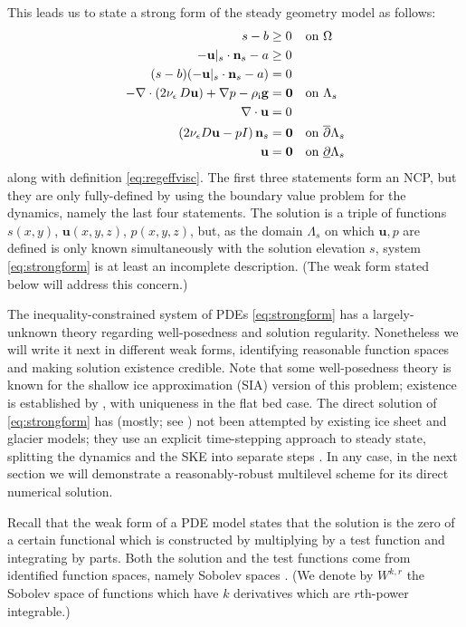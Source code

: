 \documentclass[letterpaper,final,12pt,reqno]{amsart}
\theoremstyle{claim}
\newcommand{\eps}{\epsilon}
\newcommand{\bn}{\mathbf{n}}
\newcommand{\bu}{\mathbf{u}}
\newcommand{\bzero}{\bm{0}}
\newcommand{\rhoi}{\rho_{\text{i}}}
\numberwithin{equation}{section}
\numberwithin{figure}{section}
\numberwithin{table}{section}
\numberwithin{theorem}{section}
\begin{document}
This leads us to state a strong form of the steady geometry model as follows:
\begin{align}
s - b &\ge 0 && \text{on $\Omega$} \label{eq:strongform} \\
- \bu|_s \cdot \bn_s - a &\ge 0 \notag \\
(s - b) (- \bu|_s \cdot \bn_s - a) &= 0 \notag \\
- \nabla \cdot \left(2 \nu_\eps\, D\bu\right) + \nabla p - \rhoi \mathbf{g} &= \bzero && \text{on $\Lambda_s$} \notag \\
\nabla \cdot \bu &= 0 \notag \\
\left(2 \nu_\eps D\bu - pI\right) \bn_s &= \bzero && \text{on $\overline{\partial} \Lambda_s$} \notag \\
\bu &= \bzero && \text{on $\underline{\partial} \Lambda_s$} \notag
\end{align}
along with definition \eqref{eq:regeffvisc}.  The first three statements form an NCP, but they are only fully-defined by using the boundary value problem for the dynamics, namely the last four statements.  The solution is a triple of functions $s(x,y)$, $\bu(x,y,z)$, $p(x,y,z)$, but, as the domain $\Lambda_s$ on which $\bu,p$ are defined is only known simultaneously with the solution elevation $s$, system \eqref{eq:strongform} is at least an incomplete description.  (The weak form stated below will address this concern.)

The inequality-constrained system of PDEs \eqref{eq:strongform} has a largely-unknown theory regarding well-posedness and solution regularity.  Nonetheless we will write it next in different weak forms, identifying reasonable function spaces and making solution existence credible.  Note that some well-posedness theory is known for the shallow ice approximation (SIA) version of this problem; existence is established by \cite{JouvetBueler2012}, with uniqueness in the flat bed case.  The direct solution of \eqref{eq:strongform} has (mostly; see \cite{WirbelJarosch2020}) not been attempted by existing ice sheet and glacier models; they use an explicit time-stepping approach to steady state, splitting the dynamics and the SKE into separate steps \cite[for example]{Jouvetetal2008,Lengetal2012}.  In any case, in the next section we will demonstrate a reasonably-robust multilevel scheme for its direct numerical solution.

Recall that the weak form of a PDE model states that the solution is the zero of a certain functional which is constructed by multiplying by a test function and integrating by parts.  Both the solution and the test functions come from identified function spaces, namely Sobolev spaces \cite{Evans2010}.  (We denote by $W^{k,r}$ the Sobolev space of functions which have $k$ derivatives which are $r$th-power integrable.)
\end{document}
